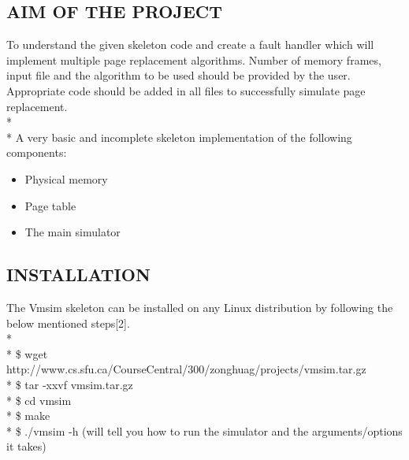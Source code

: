 \documentclass[12pt, oneside, a4paper]{report}
\begin{document}
\subsection*{AIM OF THE PROJECT}
To understand the given skeleton code and create a fault handler which will implement multiple page replacement algorithms. Number of memory frames, input file and the algorithm to be used should be provided by the user.  Appropriate code should be added in all files to successfully simulate page replacement.
\\*
\\*
A very basic and incomplete skeleton implementation of the following components:
\begin{itemize}
\item Physical memory
\item Page table
\item The main simulator
\end{itemize}

\subsection*{INSTALLATION}
The Vmsim skeleton can be installed on any Linux distribution by following the below mentioned steps[2].
\\*
\\*
\$ wget http://www.cs.sfu.ca/CourseCentral/300/zonghuag/projects/vmsim.tar.gz
\\*
\$ tar -xxvf vmsim.tar.gz
\\*
\$ cd vmsim
\\*
\$ make
\\*
\$ ./vmsim -h (will tell you how to run the simulator and the arguments/options it takes)
\end{document}
